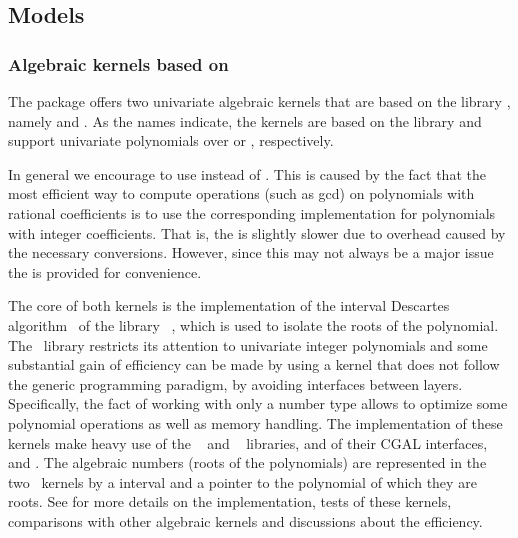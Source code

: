 
\subsection{Models}

\subsubsection{Algebraic kernels based on \rs}

The package offers two univariate algebraic kernels that are based on the
library \rs{} \cite{cgal:r-rs}, namely
 and
. As the names indicate, the kernels
are based on the library \rs{} \cite{cgal:r-rs} and support univariate
polynomials over  or , respectively.

In general we encourage to use 
instead of . This is caused by the
fact that the most efficient way to compute operations (such as gcd) on
polynomials with rational coefficients is to use the corresponding
implementation for polynomials with integer coefficients.  That is, the
 is slightly slower due to overhead
caused by the necessary conversions.  However, since this may not always be
a major issue the  is provided for
convenience.

The core of both kernels is the implementation of the interval Descartes
algorithm~\cite{cgal:rz-jcam-04} of the library \rs~\cite{cgal:r-rs}, which
is used to isolate the roots of the polynomial.  The \rs~library restricts
its attention to univariate integer polynomials and some substantial gain
of efficiency can be made by using a kernel that does not follow the
generic programming paradigm, by avoiding interfaces between layers.
Specifically, the fact of working with only a number type allows to
optimize some polynomial operations as well as memory handling.  The
implementation of these kernels make heavy use of the \mpfr~
\cite{cgal:mt-mpfr} and \mpfi~\cite{cgal:r-mpfi} libraries, and of their
CGAL interfaces,  and .  The algebraic numbers (roots
of the polynomials) are represented in the two \rs~kernels by a 
interval and a pointer to the polynomial of which they are roots.  See
\cite{cgal:lpt-wea-09} for more details on the implementation, tests of
these kernels, comparisons with other algebraic kernels and discussions
about the efficiency.
